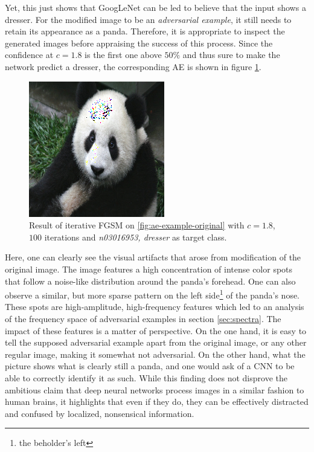 \documentclass[11pt, a4paper]{article}
\begin{document}
Yet, this just shows that GoogLeNet can be led to believe that the input shows a dresser. For the modified image to be an \emph{adversarial example}, it still needs to retain its appearance as a panda. Therefore, it is appropriate to inspect the generated images before appraising the success of this process. Since the confidence at $c = 1.8$ is the first one above $50\%$ and thus sure to make the network predict a dresser, the corresponding AE is shown in figure \ref{fig:ae-panda-dresser-1dot8}.

\begin{figure}[h!tb]
	\centering
	\includegraphics[scale=0.90]{images/aes/panda_dresser_100_1dot8.png}
	\caption[Flawed adversarial example obtained with high adaption strength]{Result of iterative FGSM on \ref{fig:ae-example-original} with $c = 1.8$, $100$ iterations and \emph{n03016953, dresser} as target class.}
	\label{fig:ae-panda-dresser-1dot8}
\end{figure}

Here, one can clearly see the visual artifacts that arose from modification of the original image. The image features a high concentration of intense color spots that follow a noise-like distribution around the panda's forehead. One can also observe a similar, but more sparse pattern on the left side\footnote{the beholder's left} of the panda's nose. These spots are high-amplitude, high-frequency features which led to an analysis of the frequency space of adversarial examples in section \ref{sec:spectra}. The impact of these features is a matter of perspective. On the one hand, it is easy to tell the supposed adversarial example apart from the original image, or any other regular image, making it somewhat not adversarial. On the other hand, what the picture shows what is clearly still a panda, and one would ask of a CNN to be able to correctly identify it as such. While this finding does not disprove the ambitious claim that deep neural networks process images in a similar fashion to human brains, it highlights that even if they do, they can be effectively distracted and confused by localized, nonsensical information.
\end{document}
